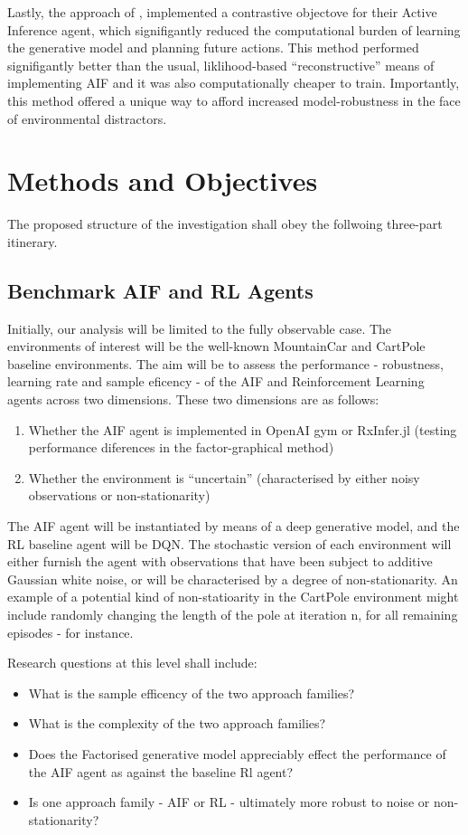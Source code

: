 \documentclass[12pt, twoside]{report}
\begin{document}
Lastly, the approach of \textcite{Contrastive-AIF}, implemented a contrastive objectove for their Active Inference agent, which signifigantly reduced the computational burden of learning the generative model and planning future actions. This method performed signifigantly better than the usual, liklihood-based ``reconstructive'' means of implementing AIF and it was also computationally cheaper to train. Importantly, this method offered a unique way to afford increased model-robustness in the face of environmental distractors. 


\section{Methods and Objectives}
The proposed structure of the investigation shall obey the follwoing three-part itinerary. 

\subsection{Benchmark AIF and RL Agents}
Initially, our analysis will be limited to the fully observable case. The environments of interest will be the well-known MountainCar and CartPole baseline environments. The aim will be to assess the performance - robustness, learning rate and sample eficency - of the AIF and Reinforcement Learning agents across two dimensions. These two dimensions are as follows:
\begin{enumerate}
\item Whether the AIF agent is implemented in OpenAI gym or RxInfer.jl (testing performance diferences in the factor-graphical method)
\item Whether the environment is ``uncertain'' (characterised by either noisy observations or non-stationarity)
\end{enumerate}

The AIF agent will be instantiated by means of a deep generative model, and the RL baseline agent will be DQN. The stochastic version of each environment will either furnish the agent with observations that have been subject to additive Gaussian white noise, or will be characterised by a degree of non-stationarity. An example of a potential kind of non-statioarity in the CartPole environment might include randomly changing the length of the pole at iteration n, for all remaining episodes - for instance.  

Research questions at this level shall include:
\begin{itemize}
\item What is the sample efficency of the two approach families?
\item What is the complexity of the two approach families?
\item Does the Factorised generative model appreciably effect the performance of the AIF agent as against the baseline Rl agent?
\item Is one approach family - AIF or RL - ultimately more robust to noise or non-stationarity?
\end{itemize}  
   
\end{document}
